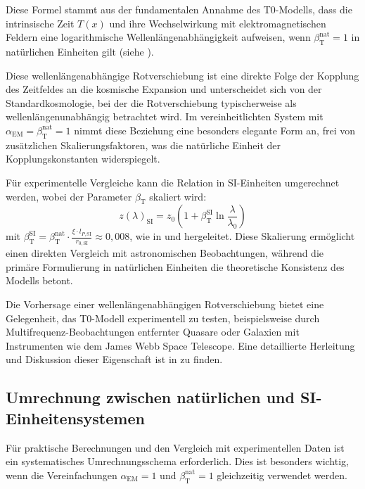 \documentclass[12pt,a4paper]{article}
\newcommand{\Tfield}{T(x)}
\newcommand{\alphaEM}{\alpha_{\text{EM}}}
\newcommand{\betaT}{\beta_{\text{T}}}
\begin{document}
	Diese Formel stammt aus der fundamentalen Annahme des T0-Modells, dass die intrinsische Zeit \(\Tfield\) und ihre Wechselwirkung mit elektromagnetischen Feldern eine logarithmische Wellenlängenabhängigkeit aufweisen, wenn \(\betaT^{\text{nat}} = 1\) in natürlichen Einheiten gilt (siehe \cite{pascher_temp_2025}).
	
	Diese wellenlängenabhängige Rotverschiebung ist eine direkte Folge der Kopplung des Zeitfeldes an die kosmische Expansion und unterscheidet sich von der Standardkosmologie, bei der die Rotverschiebung typischerweise als wellenlängenunabhängig betrachtet wird. Im vereinheitlichten System mit \(\alphaEM = \betaT^{\text{nat}} = 1\) nimmt diese Beziehung eine besonders elegante Form an, frei von zusätzlichen Skalierungsfaktoren, was die natürliche Einheit der Kopplungskonstanten widerspiegelt.
	
	Für experimentelle Vergleiche kann die Relation in SI-Einheiten umgerechnet werden, wobei der Parameter \(\betaT\) skaliert wird:
	\begin{equation}
		z(\lambda)_{\text{SI}} = z_0 \left(1 + \betaT^{\text{SI}} \ln \frac{\lambda}{\lambda_0}\right)
	\end{equation}
	mit \(\betaT^{\text{SI}} = \betaT^{\text{nat}} \cdot \frac{\xi \cdot l_{P,\text{SI}}}{r_{0,\text{SI}}} \approx 0,008\), wie in \cite{pascher_emergente_gravitation_2025} und \cite{pascher_params_2025} hergeleitet. Diese Skalierung ermöglicht einen direkten Vergleich mit astronomischen Beobachtungen, während die primäre Formulierung in natürlichen Einheiten die theoretische Konsistenz des Modells betont.
	
	Die Vorhersage einer wellenlängenabhängigen Rotverschiebung bietet eine Gelegenheit, das T0-Modell experimentell zu testen, beispielsweise durch Multifrequenz-Beobachtungen entfernter Quasare oder Galaxien mit Instrumenten wie dem James Webb Space Telescope. Eine detaillierte Herleitung und Diskussion dieser Eigenschaft ist in \cite{pascher_messdifferenzen_2025} zu finden.
	
	\subsection{Umrechnung zwischen natürlichen und SI-Einheitensystemen}
	\label{subsec:conversion}
	
	Für praktische Berechnungen und den Vergleich mit experimentellen Daten ist ein systematisches Umrechnungsschema erforderlich. Dies ist besonders wichtig, wenn die Vereinfachungen \(\alphaEM = 1\) und \(\betaT^{\text{nat}} = 1\) gleichzeitig verwendet werden.
	
\end{document}
